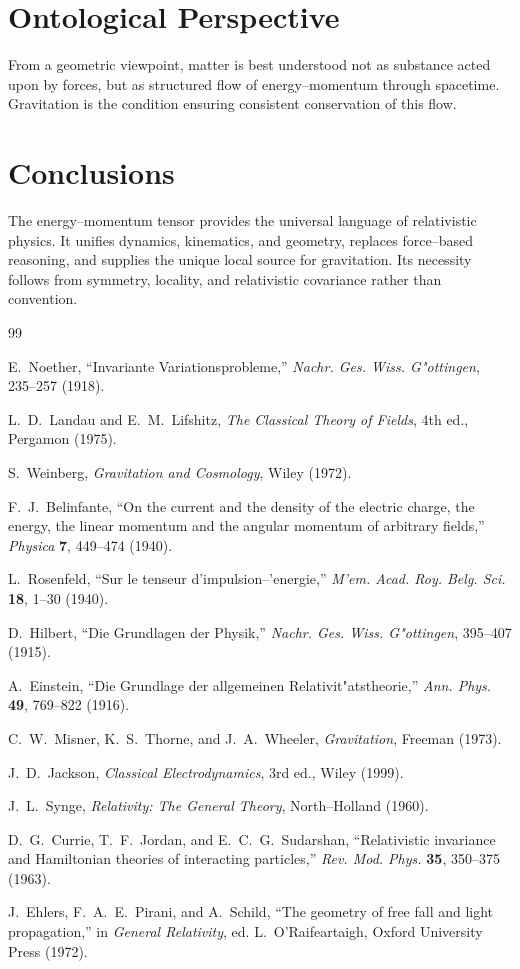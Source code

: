 \documentclass[11pt,a4paper]{article}
\begin{document}
\section{Ontological Perspective}
From a geometric viewpoint, matter is best understood not as substance acted upon by forces, but as structured flow of energy--momentum through spacetime. Gravitation is the condition ensuring consistent conservation of this flow.

\section{Conclusions}
The energy--momentum tensor provides the universal language of relativistic physics. It unifies dynamics, kinematics, and geometry, replaces force--based reasoning, and supplies the unique local source for gravitation. Its necessity follows from symmetry, locality, and relativistic covariance rather than convention.

\begin{thebibliography}{99}

E.~Noether, ``Invariante Variationsprobleme,'' \emph{Nachr. Ges. Wiss. G"ottingen}, 235--257 (1918).

L.~D.~Landau and E.~M.~Lifshitz, \emph{The Classical Theory of Fields}, 4th ed., Pergamon (1975).

S.~Weinberg, \emph{Gravitation and Cosmology}, Wiley (1972).

F.~J.~Belinfante, ``On the current and the density of the electric charge, the energy, the linear momentum and the angular momentum of arbitrary fields,'' \emph{Physica} \textbf{7}, 449--474 (1940).

L.~Rosenfeld, ``Sur le tenseur d'impulsion--'energie,'' \emph{M'em. Acad. Roy. Belg. Sci.} \textbf{18}, 1--30 (1940).

D.~Hilbert, ``Die Grundlagen der Physik,'' \emph{Nachr. Ges. Wiss. G"ottingen}, 395--407 (1915).

A.~Einstein, ``Die Grundlage der allgemeinen Relativit"atstheorie,'' \emph{Ann. Phys.} \textbf{49}, 769--822 (1916).

C.~W.~Misner, K.~S.~Thorne, and J.~A.~Wheeler, \emph{Gravitation}, Freeman (1973).

J.~D.~Jackson, \emph{Classical Electrodynamics}, 3rd ed., Wiley (1999).

J.~L.~Synge, \emph{Relativity: The General Theory}, North--Holland (1960).

D.~G.~Currie, T.~F.~Jordan, and E.~C.~G.~Sudarshan, ``Relativistic invariance and Hamiltonian theories of interacting particles,'' \emph{Rev. Mod. Phys.} \textbf{35}, 350--375 (1963).

J.~Ehlers, F.~A.~E.~Pirani, and A.~Schild, ``The geometry of free fall and light propagation,'' in \emph{General Relativity}, ed. L.~O'Raifeartaigh, Oxford University Press (1972).

\end{thebibliography}
\end{document}
